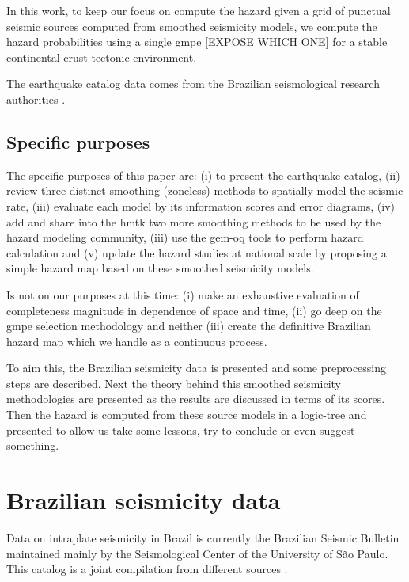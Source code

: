 \documentclass[draft, grl]{agutex}
\begin{document}
\begin{article}
In this work, to keep our focus on compute the hazard given a grid of punctual seismic sources computed from smoothed seismicity models, we compute the hazard probabilities using a single \gls{gmpe} [EXPOSE WHICH ONE] for a stable continental crust tectonic environment.

The earthquake catalog data comes from the Brazilian seismological research authorities \citep{bsb_2014}.

\subsection{Specific purposes}

The specific purposes of this paper are: 
(i) to present the \citet{bsb_2014} earthquake catalog,
(ii) review three distinct smoothing (zoneless) methods to spatially model the seismic rate,
(iii) evaluate each model by its information scores and error diagrams,
(iv) add and share into the \gls{hmtk} two more smoothing methods to be used by the hazard modeling community,
(iii) use the \gls{gem}-\glsdesc{oq} tools to perform hazard calculation and
(v) update the hazard studies at national scale by proposing a simple hazard map based on these smoothed seismicity models.

Is not on our purposes at this time: (i) make an exhaustive evaluation of completeness magnitude in dependence of space and time, (ii) go deep on the \gls{gmpe} selection methodology and neither (iii) create the definitive Brazilian hazard map which we handle as a continuous process.

To aim this, the Brazilian seismicity data is presented and some preprocessing steps are described. Next the theory behind this smoothed seismicity methodologies are presented as the results are discussed in terms of its scores. Then the hazard is computed from these source models in a logic-tree and presented to allow us take some lessons, try to conclude or even suggest something.

%
%

\section{Brazilian seismicity data}

Data on intraplate seismicity in Brazil is currently the Brazilian Seismic Bulletin maintained mainly by the Seismological Center of the University of São Paulo. This catalog is a joint compilation from different sources \citep{bsb_2014}.



\end{article}
\end{document}
